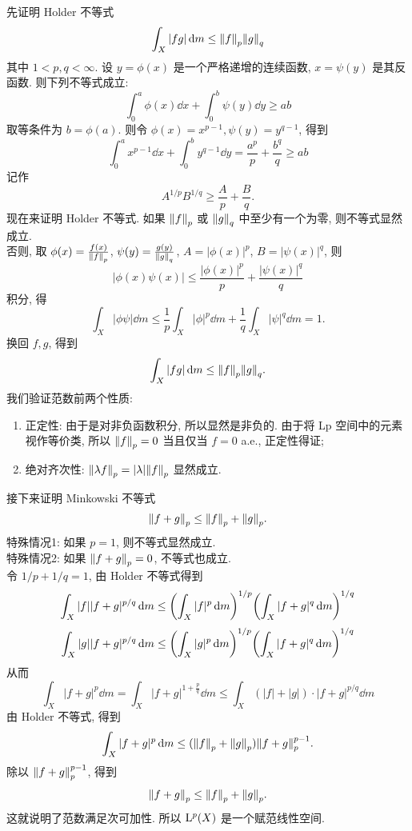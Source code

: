        \begin{prf}
            先证明 Holder 不等式
            \[\int_X |fg| \dd{m} \leq \norm{f}_p \norm{g}_q\]
            其中 \(1<p,q<\infty\). 设 \(y=\phi(x)\) 是一个严格递增的连续函数, \(x=\psi(y)\) 是其反函数. 则下列不等式成立:
            \[\int_0^a \phi(x)\dd{x}+\int_0^b \psi(y)\dd{y} \geq ab\]
            取等条件为 \(b=\phi(a)\). 则令 \(\phi(x)=x^{p-1}, \psi(y)=y^{q-1}\), 得到
            \[\int_0^a x^{p-1}\dd{x}+\int_0^b y^{q-1}\dd{y} = \frac{a^p}{p} + \frac{b^q}{q} \geq ab\]
            记作
            \[A^{1/p}B^{1/q} \geq \frac{A}{p}+\frac{B}{q}.\]
            现在来证明 Holder 不等式. 如果 \(\norm{f}_p\) 或 \(\norm{g}_q\) 中至少有一个为零, 则不等式显然成立. \\
            否则, 取 \(\phi(x)=\frac{f(x)}{\norm{f}_p}\), \(\psi(y)=\frac{g(y)}{\norm{g}_q}\), \(A=|\phi(x)|^p\), \(B=|\psi(x)|^q\), 则
            \[|\phi(x)\psi(x)|\leq\frac{|\phi(x)|^p}{p}+\frac{|\psi(x)|^q}{q}\]
            积分, 得
            \[\int_X |\phi\psi| \dd{m} \leq \frac{1}{p}\int_X |\phi|^p \dd{m} + \frac{1}{q}\int_X |\psi|^q \dd{m} = 1.\]
            换回 \(f,g\), 得到
            \[\int_X |fg| \dd{m} \leq \norm{f}_p \norm{g}_q.\]
            我们验证范数前两个性质:
            \begin{enumerate}[label=(\roman*)]
                \item 正定性: 由于是对非负函数积分, 所以显然是非负的. 由于将 Lp 空间中的元素视作等价类, 所以 \(\norm{f}_p=0\) 当且仅当 \(f=0\) a.e., 正定性得证;
                \item 绝对齐次性: \(\norm{\lambda f}_p = |\lambda| \norm{f}_p\) 显然成立.
            \end{enumerate}
            接下来证明 Minkowski 不等式
            \[\norm{f+g}_p \leq \norm{f}_p + \norm{g}_p.\]
            特殊情况1: 如果 \(p=1\), 则不等式显然成立. \\
            特殊情况2: 如果 \(\norm{f+g}_p=0\), 不等式也成立. \\
            令 \(1/p+1/q=1\), 由 Holder 不等式得到
            \[\int_X|f||f+g|^{p/q}\dd{m}\leq\qty(\int_X|f|^p\dd{m})^{1/p}\qty(\int_X|f+g|^q\dd{m})^{1/q}\]
            \[\int_X|g||f+g|^{p/q}\dd{m}\leq\qty(\int_X|g|^p\dd{m})^{1/p}\qty(\int_X|f+g|^q\dd{m})^{1/q}\]
            从而
            \[\int_X |f+g|^p\dd{m}=\int_X |f+g|^{1+\frac{p}{q}}\dd{m}\leq\int_X(|f|+|g|)\cdot|f+g|^{p/q}\dd{m}\]
            由 Holder 不等式, 得到
            \[\int_X |f+g|^p\dd{m} \leq (\norm{f}_p + \norm{g}_p) \norm{f+g}_p^{p-1}.\]
            除以 \(\norm{f+g}_p^{p-1}\), 得到
            \[\norm{f+g}_p \leq \norm{f}_p + \norm{g}_p.\]
            这就说明了范数满足次可加性. 所以 \(\Lp(X)\) 是一个赋范线性空间.
        \end{prf}

